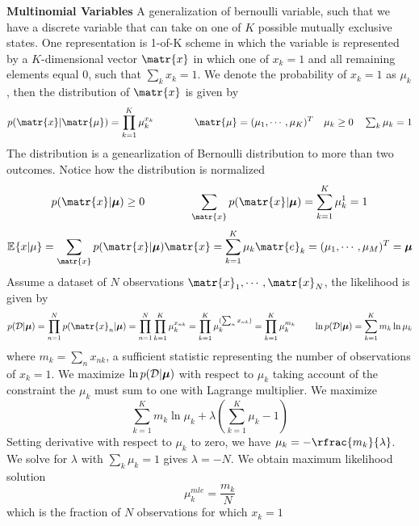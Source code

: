 \documentclass[11pt]{article}
\begin{document}
\begin{defn*}
    \textbf{Multinomial Variables} A generalization of bernoulli variable, such that we have a discrete variable that can take on one of $K$ possible mutually exclusive states. One representation is 1-of-K scheme in which the variable is represented by a $K$-dimensional vector $\matr{x}$ in which one of $x_k = 1$ and all remaining elements equal 0, such that $\textstyle\sum_k x_k = 1$. We denote the probability of $x_k=1$ as $\mu_k$, then the distribution of $\matr{x}$ is given by 
    \[
        p(\matr{x}|\matr{\mu}) = \prod_{k=1}^K \mu_k^{x_k}
        \quad \quad \quad \quad 
        \matr{\mu} = (\mu_1,\cdots,\mu_K)^T 
        \quad 
        \mu_k \geq 0 \quad \textstyle\sum_k \mu_k = 1
    \]
    The distribution is a genearlization of Bernoulli distribution to more than two outcomes. Notice how the distribution is normalized 
    \[
        p(\matr{x}|\bmu) \geq 0
        \quad \quad \quad \quad 
        \sum_{\matr{x}} p(\matr{x}|\bmu) = \sum_{k=1}^K \mu_k^1 = 1
    \]
    \[
        \E{x|\mu} = \sum_{\matr{x}} p(\matr{x}|\bmu)\matr{x} = \sum_{k=1}^K \mu_k \matr{e}_k = (\mu_1, \cdots, \mu_M)^T = \bmu
    \]
    Assume a dataset of $N$ observations $\matr{x}_1,\cdots, \matr{x}_N$, the likelihood is given by 
    \[
        p(\mathcal{D}|\bmu) = \prod_{n=1}^N p(\matr{x}_n | \bmu)
        = \prod_{n=1}^N \prod_{k=1}^K \mu_k^{x_{nk}} 
        = \prod_{k=1}^K \mu_k^{(\sum_n x_{nk})} 
        = \prod_{k=1}^K \mu_k^{m_k}
        \quad\quad 
        \ln{p(\mathcal{D}|\bmu)} = \sum_{k=1}^K m_k \ln{\mu_k}
    \]
    where $m_k = \textstyle\sum_n x_{nk}$, a sufficient statistic representing the number of observations of $x_k =1$. We maximize $\ln{p(\mathcal{D}|\boldsymbol{\mu})}$ with respect to $\mu_k$ taking account of the constraint the $\mu_k$ must sum to one with Lagrange multiplier. We maximize 
    \[
        \sum_{k=1}^K m_k \ln{\mu_k} + \lambda \left( \sum_{k=1}^K \mu_k - 1 \right)
    \]
    Setting derivative with respect to $\mu_k$ to zero, we have $\mu_k = - \rfrac{m_k}{\lambda}$. We solve for $\lambda$ with $\textstyle \sum_k \mu_k = 1$ gives $\lambda = -N$. We obtain maximum likelihood solution 
    \[
        \mu_k^{mle} = \frac{m_k}{N}    
    \]
    which is the fraction of $N$ observations for which $x_k =1$
\end{defn*}
\end{document}
